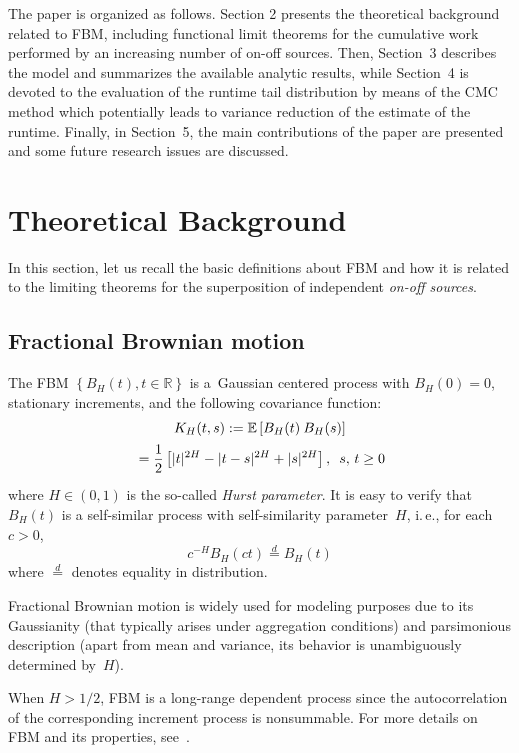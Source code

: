 \begin{multicols}{2}
The paper is organized as follows. Section 2 presents the theoretical background 
related to  FBM, including functional limit theorems for the cumulative  work 
performed  by an increasing  number of on-off sources.    
Then, Section~3 describes the model and summarizes the available analytic results, 
while Section~4 is devoted to the evaluation of the runtime tail distribution 
by means of the CMC method which potentially leads to variance 
reduction of the estimate of the runtime. Finally, in Section~5, the main 
contributions of the paper are presented and some future research issues are discussed. 

\section{Theoretical Background}

\noindent
In this section, let us recall the basic definitions about FBM and how it is 
related to the limiting theorems for the superposition of independent 
\textit{on-off sources}.

\subsection{Fractional Brownian motion}

\noindent
The FBM $\left\{B_H(t), t \in \mathbb{R} \right\}$ is a~Gaussian centered process 
with $B_H(0)=0$, stationary increments, and the following covariance function:
  \begin{multline*}
       K_H(t,s) := \mathbb{E} \left[ B_H(t) \: B_H(s) \right]\\
       {}=
       \displaystyle\frac{\displaystyle 1\mathstrut}{\displaystyle 2\mathstrut} \left[
       |t|^{2H} - |t-s|^{2H} + |s|^{2H} \right],\enskip s,\,t\ge 0 
     \end{multline*}
where $H \in (0,1)$ is the so-called \textit{Hurst parameter}. 
It is easy to verify that~$B_H(t)$  is a self-similar process with 
self-similarity parameter~$H$, i.\,e., for each $c>0$,
$$
  c^{-H}B_H(ct) \stackrel{d}{=} B_H(t)
$$
where  $\stackrel{d}{=}$  denotes equality in distribution.

Fractional Brownian motion is widely used for modeling purposes due to its 
Gaussianity (that typically arises under aggregation conditions) 
and parsimonious description (apart from mean and variance, its behavior 
is unambiguously determined by~$H$).

When $H>1/2$,  FBM is a long-range dependent process since the
 autocorrelation of the corresponding increment process is nonsummable. 
 For more details on FBM and its properties, see~\cite{13-luk-1}.



\end{multicols}
